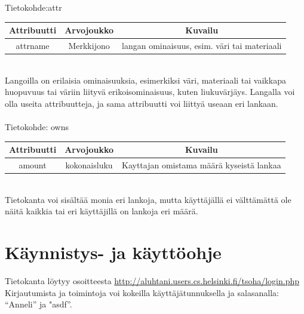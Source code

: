\documentclass[12pt]{article}
\begin{document}
\ \\ \ \\
Tietokohde:attr\\
\begin{tabular}{|c|c|c|}
\hline
Attribuutti & Arvojoukko & Kuvailu \\
\hline
attrname & Merkkijono & langan ominaisuus, esim. väri tai materiaali\\
\hline   
\end{tabular}
\\
Langoilla on erilaisia ominaisuuksia, esimerkiksi väri, materiaali tai vaikkapa huopuvuus tai väriin liityvä erikoisominaisuus, kuten liukuvärjäys. Langalla voi olla useita attribuutteja, ja sama attribuutti voi liittyä useaan eri lankaan. 
\ \\ \ \\
Tietokohde: owns\\
\begin{tabular}{|c|c|c|}
\hline
Attribuutti & Arvojoukko & Kuvailu \\
\hline
amount & kokonaisluku & Kayttajan omistama määrä kyseistä lankaa\\
\hline  
\end{tabular}
\\
Tietokanta voi sisältää monia eri lankoja, mutta käyttäjällä ei välttämättä ole näitä kaikkia tai eri käyttäjillä on lankoja eri määrä. 
\section{Käynnistys- ja käyttöohje}
Tietokanta löytyy osoitteesta \href{http://aluhtani.users.cs.helsinki.fi/tsoha/login.php}{http://aluhtani.users.cs.helsinki.fi/tsoha/login.php}
\\
Kirjautumista ja toimintoja voi kokeilla käyttäjätunnuksella ja salasanalla: ``Anneli'' ja "asdf''.
\end{document}
